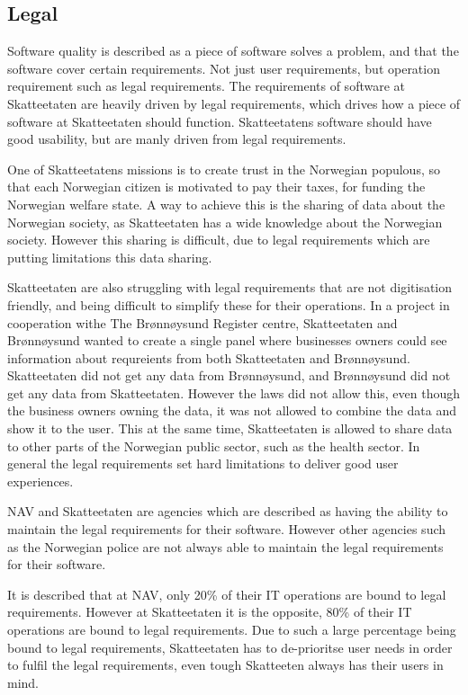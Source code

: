 \subsection{Legal} \label{sec:legal}
Software quality is described as a piece of software solves a problem, and that the software cover certain requirements. Not just user requirements, but operation requirement such as legal requirements. The requirements of software at Skatteetaten are heavily driven by legal requirements, which drives how a piece of software at Skatteetaten should function. Skatteetatens software should have good usability, but are manly driven from legal requirements.

One of Skatteetatens missions is to create trust in the Norwegian populous, so that each Norwegian citizen is motivated to pay their taxes, for funding the Norwegian welfare state. A way to achieve this is the sharing of data about the Norwegian society, as Skatteetaten has a wide knowledge about the Norwegian society. However this sharing is difficult, due to legal requirements which are putting limitations this data sharing.

Skatteetaten are also struggling with legal requirements that are not digitisation friendly, and being difficult to simplify these for their operations. In a project in cooperation withe The Brønnøysund Register centre, Skatteetaten and Brønnøysund wanted to create a single panel where businesses owners could see information about requreients from both Skatteetaten and Brønnøysund. Skatteetaten did not get any data from Brønnøysund, and Brønnøysund did not get any data from Skatteetaten. However the laws did not allow this, even though the business owners owning the data, it was not allowed to combine the data and show it to the user. This at the same time, Skatteetaten is allowed to share data to other parts of the Norwegian public sector, such as the health sector. In general the legal requirements set hard limitations to deliver good user experiences.

NAV and Skatteetaten are agencies which are described as having the ability to maintain the legal requirements for their software. However other agencies such as the Norwegian police are not always able to maintain the legal requirements for their software.

It is described that at NAV, only 20\% of their IT operations are bound to legal requirements. However at Skatteetaten it is the opposite, 80\% of their IT operations are bound to legal requirements. Due to such a large percentage being bound to legal requirements, Skatteetaten has to de-prioritse user needs in order to fulfil the legal requirements, even tough Skatteeten always has their users in mind.

